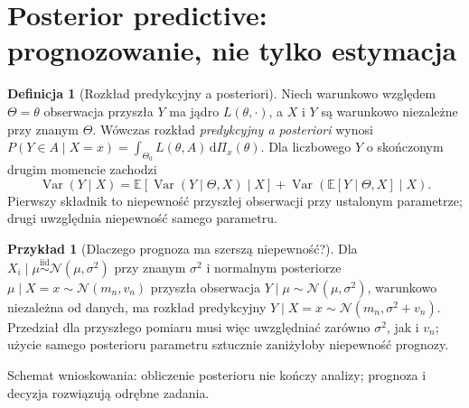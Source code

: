 \documentclass[11pt,a4paper,oneside]{report}
\numberwithin{equation}{chapter}
\theoremstyle{plain}
\theoremstyle{definition}
\newtheorem{definicja}{Definicja}[chapter]
\newtheorem{przyklad}{Przykład}[chapter]
\theoremstyle{remark}
\newcommand{\E}{\mathbb E}
\newcommand{\Var}{\operatorname{Var}}
\newcommand{\dd}{\mathrm d}
\newcommand{\iid}{\mathrel{\overset{\mathrm{iid}}\sim}}
\begin{document}
\section{Posterior predictive: prognozowanie, nie tylko estymacja}
\begin{definicja}[Rozkład predykcyjny a posteriori]
Niech warunkowo względem $\Theta=\theta$ obserwacja przyszła
$Y$ ma jądro $L(\theta,\cdot)$, a $X$ i $Y$ są warunkowo
niezależne przy znanym $\Theta$. Wówczas rozkład
\emph{predykcyjny a posteriori} wynosi
$P(Y\in A\mid X=x)=\int_{\Theta_0}L(\theta,A)\,\dd\Pi_x(\theta)$.
Dla liczbowego $Y$ o skończonym drugim momencie zachodzi
\[
 \Var(Y\mid X)=\E[\Var(Y\mid\Theta,X)\mid X]
 +\Var(\E[Y\mid\Theta,X]\mid X).
\]
Pierwszy składnik to niepewność przyszłej obserwacji przy ustalonym
parametrze; drugi uwzględnia niepewność samego parametru.
\end{definicja}

\begin{przyklad}[Dlaczego prognoza ma szerszą niepewność?]
Dla $X_i\mid\mu\iid\mathcal N(\mu,\sigma^2)$ przy znanym
$\sigma^2$ i normalnym posteriorze $\mu\mid X=x\sim
\mathcal N(m_n,v_n)$ przyszła obserwacja $Y\mid\mu\sim
\mathcal N(\mu,\sigma^2)$, warunkowo niezależna od danych,
ma rozkład predykcyjny $Y\mid X=x\sim\mathcal N(m_n,\sigma^2+v_n)$.
Przedział dla przyszłego pomiaru musi więc uwzględniać zarówno
$\sigma^2$, jak i $v_n$; użycie samego posterioru parametru
sztucznie zaniżyłoby niepewność prognozy.
\end{przyklad}

\begin{center}
\begin{minipage}{\textwidth}
\centering
{}

{\small Schemat wnioskowania: obliczenie posterioru nie kończy analizy;
prognoza i decyzja rozwiązują odrębne zadania.}
\end{minipage}
\end{center}
\end{document}

